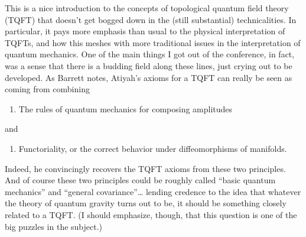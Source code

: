 \documentclass{article}
\def\tightlist{}
\begin{document}
This is a nice introduction to the concepts of topological quantum field
theory (TQFT) that doesn't get bogged down in the (still substantial)
technicalities. In particular, it pays more emphasis than usual to the
physical interpretation of TQFTs, and how this meshes with more
traditional issues in the interpretation of quantum mechanics. One of
the main things I got out of the conference, in fact, was a sense that
there is a budding field along these lines, just crying out to be
developed. As Barrett notes, Atiyah's axioms for a TQFT can really be
seen as coming from combining

\begin{enumerate}
\def\labelenumi{\alph{enumi})}
\tightlist
\item
  The rules of quantum mechanics for composing amplitudes
\end{enumerate}

and

\begin{enumerate}
\def\labelenumi{\alph{enumi})}
\setcounter{enumi}{1}
\tightlist
\item
  Functoriality, or the correct behavior under diffeomorphisms of
  manifolds.
\end{enumerate}

Indeed, he convincingly recovers the TQFT axioms from these two
principles. And of course these two principles could be roughly called
``basic quantum mechanics'' and ``general covariance''\ldots{} lending
credence to the idea that whatever the theory of quantum gravity turns
out to be, it should be something closely related to a TQFT. (I should
emphasize, though, that this question is one of the big puzzles in the
subject.)
\end{document}
